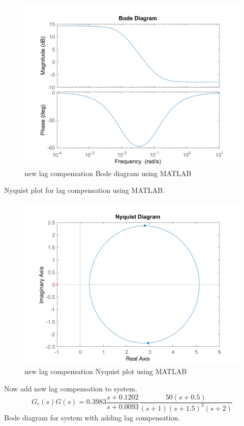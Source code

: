 \begin{figure}[H]
	\caption{new lag compensation Bode diagram using MATLAB}
	\centering
	\includegraphics[width=12cm]{../Figure/Q1/b/new_controller.png}
\end{figure}
Nyquist plot for lag compensation using MATLAB.
\begin{figure}[H]
	\caption{new lag compensation Nyquist plot using MATLAB}
	\centering
	\includegraphics[width=12cm]{../Figure/Q1/b/new_controller_nyquist.png}
\end{figure}
Now add new lag compensation to system.
$$
G_c(s)G(s) = 0.3983 \dfrac{s + 0.1202}{s + 0.0093}\dfrac{50(s+0.5)}{(s+1)(s+1.5)^{3}(s+2)}
$$
Bode diagram for system with adding lag compensation.
